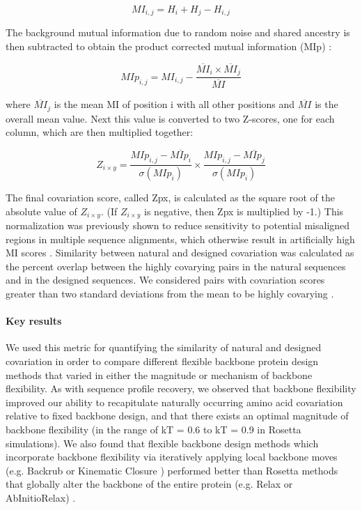 \begin{equation}
  \label{eq:mut-info}
  M{I_{i,j}} = {H_i} + {H_j} - {H_{i,j}}
\end{equation}

The background mutual information due to random noise and shared ancestry is then subtracted to obtain the product corrected mutual information (MIp) \cite{dunn_mutual_2008}:

\begin{equation}
  \label{eq:mut-info-p}
  MI{p_{i,j}} = M{I_{i,j}} - \frac{{{{\overline {MI} }_i} \times {{\overline {MI} }_j}}}{{\overline {MI} }}
\end{equation}

where $\overline{MI}_j$ is the mean MI of position i with all other positions and $\overline{MI}$ is the overall mean value. Next this value is converted to two Z-scores, one for each column, which are then multiplied together:

\begin{equation}
  \label{eq:covariation-z-score}
  {Z_{i \times y}} = \frac{{MI{p_{i,j}} - \overline {MI{p_i}} }}{{\sigma (MI{p_i})}} \times \frac{{MI{p_{i,j}} - \overline {MI{p_j}} }}{{\sigma (MI{p_i})}}
\end{equation}

The final covariation score, called Zpx, is calculated as the square root of the absolute value of $Z_{i \times y}$. (If $Z_{i \times y}$ is negative, then Zpx is multiplied by -1.) This normalization was previously shown to reduce sensitivity to potential misaligned regions in multiple sequence alignments, which otherwise result in artificially high MI scores \cite{dickson_identifying_2010}. Similarity between natural and designed covariation was calculated as the percent overlap between the highly covarying pairs in the natural sequences and in the designed sequences. We considered pairs with covariation scores greater than two standard deviations from the mean to be highly covarying \cite{ollikainen_computational_2013}.

\paragraph{Key results}

We used this metric for quantifying the similarity of natural and designed covariation in order to compare different flexible backbone protein design methods that varied in either the magnitude or mechanism of backbone flexibility. As with sequence profile recovery, we observed that backbone flexibility improved our ability to recapitulate naturally occurring amino acid covariation relative to fixed backbone design, and that there exists an optimal magnitude of backbone flexibility (in the range of kT = 0.6 to kT = 0.9 in Rosetta simulations). We also found that flexible backbone design methods which incorporate backbone flexibility via iteratively applying local backbone moves (e.g. Backrub \cite{smith_backrub-like_2008} or Kinematic Closure \cite{mandell_sub-angstrom_2009}) performed better than Rosetta methods that globally alter the backbone of the entire protein (e.g. Relax or AbInitioRelax) \cite{ollikainen_computational_2013}.

